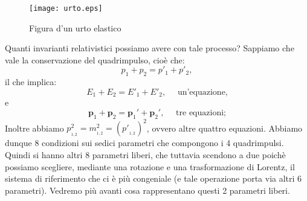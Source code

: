 \begin{figure}[htbp]
\begin{center}
\texttt{[image: urto.eps]}
\caption{Figura d'un urto elastico} \label{fig:urto}
\end{center}
\end{figure}

Quanti invarianti relativistici possiamo avere con tale processo?
Sappiamo che vale la conservazione del quadrimpulso, cio\`e che:
$$
p_1+p_2=p'_1+p'_2,
$$
il che implica:
$$
E_1+E_2=E'_1+E'_2, \quad\mbox{ un'equazione,}
$$
e
$$
\mathbf{p}_1+\mathbf{p}_2=\mathbf{p}_1{}'+\mathbf{p}_2{}',
\quad\mbox{ tre equazioni;}
$$
Inoltre abbiamo
$p_{{}_{1,2}}^2=m_{{}_{1,2}}^2=(p'_{{}_{1,2}}{})^2$, ovvero altre
quattro equazioni. Abbiamo dunque 8 condizioni sui sedici
parametri che compongono i 4 quadrimpulsi. Quindi si hanno altri 8
parametri liberi, che tuttavia scendono a due poich\`e possiamo
scegliere, mediante una rotazione e una trasformazione di Lorentz,
il sistema di riferimento che ci \`e pi\`u congeniale (e tale
operazione porta via altri 6 parametri). Vedremo pi\`u avanti cosa
rappresentano questi 2 parametri liberi.
